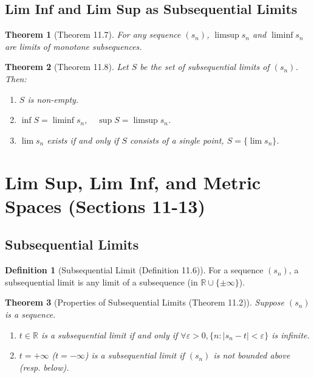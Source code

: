 \documentclass[9pt]{article}
\theoremstyle{definition}
\newtheorem{definition}{Definition}
\theoremstyle{plain}
\newtheorem{theorem}{Theorem}
\begin{document}
\subsection*{Lim Inf and Lim Sup as Subsequential Limits}
\begin{theorem}[Theorem 11.7]
For any sequence \( (s_n) \), \( \limsup s_n \) and \( \liminf s_n \) are limits of monotone subsequences.
\end{theorem}

\begin{theorem}[Theorem 11.8]
Let \( S \) be the set of subsequential limits of \( (s_n) \). Then:
\begin{enumerate}
    \item \( S \) is non-empty.
    \item \( \inf S = \liminf s_n, \quad \sup S = \limsup s_n \).
    \item \( \lim s_n \) exists if and only if \( S \) consists of a single point, \( S = \{\lim s_n\} \).
\end{enumerate}
\end{theorem}
\section*{Lim Sup, Lim Inf, and Metric Spaces (Sections 11-13)}

\subsection*{Subsequential Limits}
\begin{definition}[Subsequential Limit (Definition 11.6)]
For a sequence \( (s_n) \), a subsequential limit is any limit of a subsequence (in \( \mathbb{R} \cup \{\pm\infty\} \)).
\end{definition}

\begin{theorem}[Properties of Subsequential Limits (Theorem 11.2)]
Suppose \( (s_n) \) is a sequence.
\begin{enumerate}
    \item \( t \in \mathbb{R} \) is a subsequential limit if and only if \( \forall \varepsilon > 0, \{n : |s_n - t| < \varepsilon\} \) is infinite.
    \item \( t = +\infty \) (\( t = -\infty \)) is a subsequential limit if \( (s_n) \) is not bounded above (resp. below).
\end{enumerate}
\end{theorem}
\end{document}
